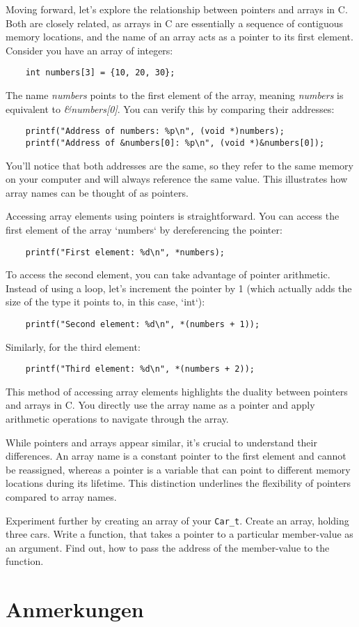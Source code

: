 \documentclass{dcbl/challenge}
\begin{document}
\begin{aufgabe}
    Moving forward, let's explore the relationship between pointers and arrays in C. Both are closely related, as arrays in C are essentially a sequence of contiguous memory locations, and the name of an array acts as a pointer to its first element.
    Consider you have an array of integers:
\begin{lstlisting}
    int numbers[3] = {10, 20, 30};
\end{lstlisting}
The name \emph{numbers} points to the first element of the array, meaning \emph{numbers} is equivalent to \emph{\&numbers[0]}. You can verify this by comparing their addresses:
\begin{lstlisting}
    printf("Address of numbers: %p\n", (void *)numbers);
    printf("Address of &numbers[0]: %p\n", (void *)&numbers[0]);
\end{lstlisting}
You'll notice that both addresses are the same, so they refer to the same memory on your computer and will always reference the same value. This illustrates how array names can be thought of as pointers.

Accessing array elements using pointers is straightforward. You can access the first element of the array `numbers` by dereferencing the pointer:
\begin{lstlisting}
    printf("First element: %d\n", *numbers);
\end{lstlisting}
To access the second element, you can take advantage of pointer arithmetic. Instead of using a loop, let's increment the pointer by 1 (which actually adds the size of the type it points to, in this case, `int`):
\begin{lstlisting}
    printf("Second element: %d\n", *(numbers + 1));
\end{lstlisting}
Similarly, for the third element:
\begin{lstlisting}
    printf("Third element: %d\n", *(numbers + 2));
\end{lstlisting}
This method of accessing array elements highlights the duality between pointers and arrays in C. You directly use the array name as a pointer and apply arithmetic operations to navigate through the array.

While pointers and arrays appear similar, it's crucial to understand their differences. An array name is a constant pointer to the first element and cannot be reassigned, whereas a pointer is a variable that can point to different memory locations during its lifetime. This distinction underlines the flexibility of pointers compared to array names.

Experiment further by creating an array of your \texttt{Car\_t}. 
Create an array, holding three cars. 
Write a function, that takes a pointer to a particular member-value as an argument.
Find out, how to pass the address of the member-value to the function.

\end{aufgabe}

\section*{Anmerkungen}
\end{document}
